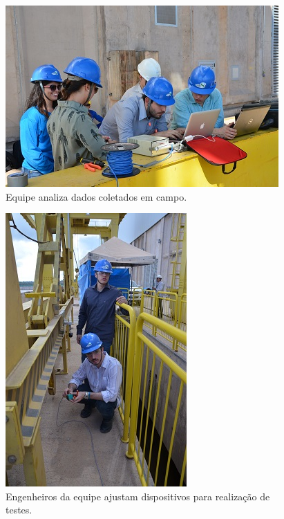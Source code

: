 \begin{figure}[h!]
  \centering
  \includegraphics[width=1\linewidth]{Fotos/JirauJunho2014/7.jpg}
  \caption{Equipe analiza dados coletados em campo.}
  \label{nov20132}
\end{figure}

\begin{figure}[h!]
  \centering
  \includegraphics[width=1\linewidth]{Fotos/JirauJunho2014/8.jpg}
  \caption{Engenheiros da equipe ajustam dispositivos para realização de
  testes.}
  \label{nov20133}
\end{figure}

